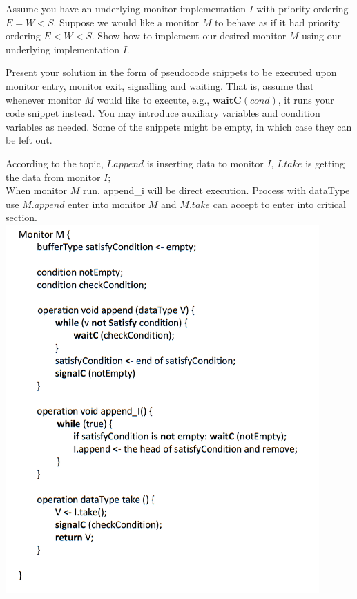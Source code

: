\documentclass[a4paper,answers]{exam}
\begin{document}
\begin{questions}
\clearpage
\question[15]

Assume you have an underlying monitor implementation $I$ with priority ordering $E
= W < S$.
Suppose we would like a monitor $M$ to behave as if it had priority ordering 
$E < W < S$.
Show how to implement our desired monitor $M$ using our underlying implementation $I$.


Present your solution in the form of pseudocode snippets to be executed upon
monitor entry, monitor exit, signalling and waiting. That is, assume
that whenever monitor $M$ would like to execute, e.g., $\mathbf{waitC}(\mathit{cond})$, it
runs your code snippet instead.
You may introduce auxiliary variables and condition variables as
needed.
Some of the snippets might be empty, in which case they can be left out.
\begin{solution}
    \newline According to the topic, $I.append$ is inserting data to monitor $I$, $I.take$ is getting the data from monitor $I$; \\
    When monitor $M$ run, append\_i will be direct execution. Process with dataType use $M.append$ enter into monitor $M$ and $M.take$ can accept to enter into critical section.\\
    \includegraphics[width=0.9\textwidth]{DV_command1}
\end{solution}


\end{questions}
\end{document}
